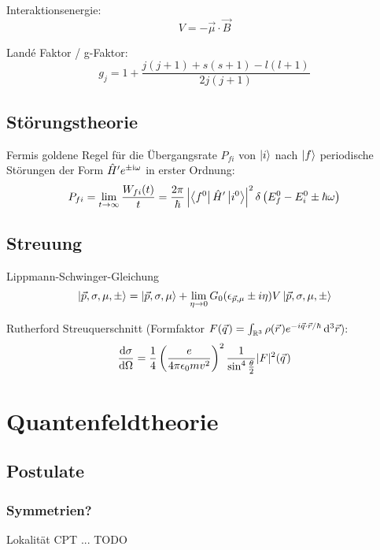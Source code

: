 \documentclass[11pt]{article}
\numberwithin{equation}{section}
\begin{document}
				Interaktionsenergie:
				\begin{equation}
					V = -\vec{\mu} \cdot \vec{B}
				\end{equation}

				Landé Faktor / g-Faktor:
				\begin{equation}
					g_j = 1+\frac{j(j+1) + s(s+1) - l(l+1)}{2j(j+1)}
				\end{equation}


		\subsection{Störungstheorie}
			\noindent
			Fermis goldene Regel für die Übergangsrate $P_{fi}$ von $\Ket{i}$ nach $\Ket{f}$ periodische Störungen der Form $\hat{H}' e^{\pm\mathrm{i}\omega}$ in erster Ordnung:
			\begin{equation}
				P_{fi} = \lim_{t\rightarrow\infty} \frac{W_{fi}(t)}{t} = \frac{2\pi}{\hbar} \left| \Bra{f^0}\hat{H}'\Ket{i^0} \right|^2 \delta\left( E_f^0 - E_i^0 \pm \hbar\omega \right)
			\end{equation}


		\subsection{Streuung}
			\noindent
			Lippmann-Schwinger-Gleichung
			\begin{equation}
				\Ket{\vec{p},\sigma,\mu,\pm} = \Ket{\vec{p}, \sigma, \mu} + \lim_{\eta\rightarrow 0} G_0(\epsilon_{\vec{p},\mu}\pm i\eta) V \Ket{\vec{p},\sigma,\mu,\pm}
			\end{equation}

			Rutherford Streuquerschnitt (Formfaktor $F(\pvec{q}) = \int_{\mathbb{R}^3} \rho(\pvec{r}) e^{-i \vec{q}\cdot\vec{r}/\hbar}\, \diff^3 \vec{r} $):
			\begin{equation}
				\tder{\sigma}{\Omega} = \frac{1}{4} \Br{\frac{e}{4\pi\epsilon_0 m v^2}}^2
				\frac{1}{\sin^4\frac{\theta}{2}} \vbr{F}^2(\pvec{q})
			\end{equation}


	\newpage
	\section{Quantenfeldtheorie} %
		\subsection{Postulate}
			\subsubsection{Symmetrien?}
				Lokalität
				CPT
				...
				TODO
\end{document}
